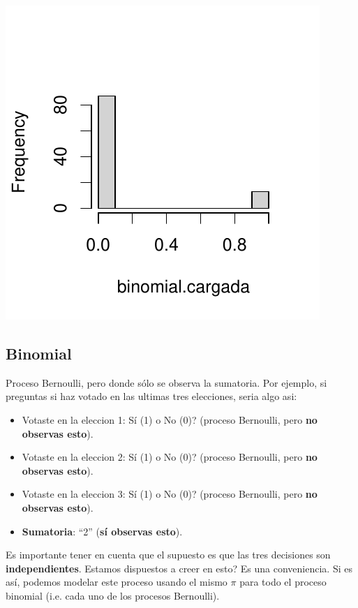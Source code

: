 \documentclass[onesided]{article}\usepackage[]{graphicx}\usepackage[]{color}
\makeatletter
\def\maxwidth{ %
  \ifdim\Gin@nat@width>\linewidth
    \linewidth
  \else
    \Gin@nat@width
  \fi
}
\newenvironment{knitrout}{}{} %
\makeatother
\begin{document}
\begin{knitrout}
{\centering \includegraphics[width=\maxwidth]{figure/bernoulli-2} 

}



\end{knitrout}


\subsection{Binomial}

Proceso Bernoulli, pero donde s\'olo se observa la sumatoria. Por ejemplo, si preguntas si haz votado en las ultimas tres elecciones, seria algo asi:

\begin{itemize}
	\item Votaste en la eleccion 1: {\color{red}S\'i} (1) o No (0)? (proceso Bernoulli, pero {\bf no observas esto}).
	\item Votaste en la eleccion 2: {\color{red}S\'i} (1) o No (0)? (proceso Bernoulli, pero {\bf no observas esto}).
	\item Votaste en la eleccion 3: S\'i (1) o {\color{red}No} (0)? (proceso Bernoulli, pero {\bf no observas esto}).
	\item {\bf Sumatoria}: ``2'' ({\bf s\'i observas esto}).
	\end{itemize}

Es importante tener en cuenta que el supuesto es que las tres decisiones son {\bf independientes}. {\color{red}Estamos dispuestos a creer en esto?} Es una conveniencia. Si es as\'i, podemos modelar este proceso usando el mismo $\pi$ para todo el proceso binomial (i.e. cada uno de los procesos Bernoulli).
\end{document}
